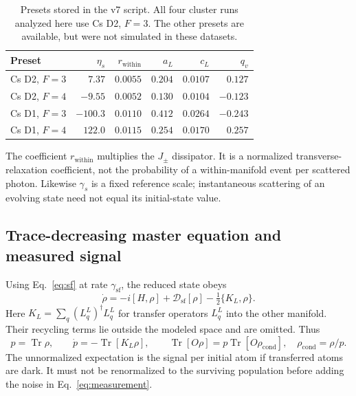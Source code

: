 \documentclass[11pt]{article}
\newcommand{\Tr}{\operatorname{Tr}}
\newcommand{\Dsf}{\mathcal{D}_{\mathrm{sf}}}
\begin{document}
\begin{table}[htbp]
\centering
\begin{tabular}{@{}lrrrrr@{}}
\toprule
Preset & $\eta_s$ & $r_{\mathrm{within}}$ & $a_L$ & $c_L$ & $q_v$ \\
\midrule
Cs D2, $F=3$ & $7.37$ & $0.0055$ & $0.204$ & $0.0107$ & $0.127$ \\
Cs D2, $F=4$ & $-9.55$ & $0.0052$ & $0.130$ & $0.0104$ & $-0.123$ \\
Cs D1, $F=3$ & $-100.3$ & $0.0110$ & $0.412$ & $0.0264$ & $-0.243$ \\
Cs D1, $F=4$ & $122.0$ & $0.0115$ & $0.254$ & $0.0170$ & $0.257$ \\
\bottomrule
\end{tabular}
\caption{Presets stored in the v7 script. All four cluster runs analyzed here
use Cs D2, $F=3$. The other presets are available, but were not simulated in
these datasets.}
\label{tab:presets}
\end{table}

The coefficient $r_{\mathrm{within}}$ multiplies the $J_\pm$ dissipator. It is a
normalized transverse-relaxation coefficient, not the probability of a
within-manifold event per scattered photon. Likewise $\gamma_s$ is a fixed
reference scale; instantaneous scattering of an evolving state need not equal
its initial-state value.

\subsection{Trace-decreasing master equation and measured signal}

Using Eq.~\eqref{eq:sf} at rate $\gamma_{\mathrm{sf}}$, the reduced state obeys
\begin{equation}
 \dot\rho=-i[H,\rho]+\Dsf[\rho]-\tfrac12\{K_L,\rho\}.
 \label{eq:loss-me}
\end{equation}
Here $K_L=\sum_q(L_q^L)^\dagger L_q^L$ for transfer operators $L_q^L$ into
the other manifold. Their recycling terms lie outside the modeled space and
are omitted. Thus
\begin{equation}
 p=\Tr\rho,\qquad \dot p=-\Tr[K_L\rho],\qquad
 \Tr[O\rho]=p\Tr[O\rho_{\mathrm{cond}}],\quad \rho_{\mathrm{cond}}=\rho/p.
 \label{eq:survival}
\end{equation}
The unnormalized expectation is the signal per initial atom if transferred
atoms are dark. It must not be renormalized to the surviving population before
adding the noise in Eq.~\eqref{eq:measurement}.
\end{document}

